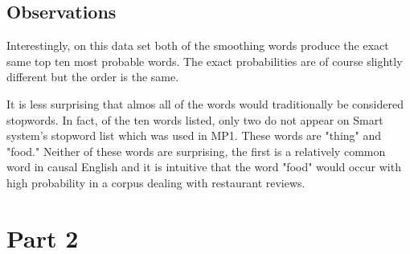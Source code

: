 \documentclass[paper=a4, fontsize=11pt]{jhwhw} %
\begin{document}
\subsection{Observations}
Interestingly, on this data set both of the smoothing words produce the exact same top ten most probable
words. The exact probabilities are of course slightly different but the order is the same. 

It is less surprising that almos all of the words would traditionally be considered stopwords. In fact, of
the ten words listed, only two do not appear on Smart system's stopword list which was used in MP1. These
words are "thing" and "food." Neither of these words are surprising, the first is a relatively common
word in causal English and it is intuitive that the word "food" would occur with high probability in
a corpus dealing with restaurant reviews.

\section{Part 2}
\end{document}
